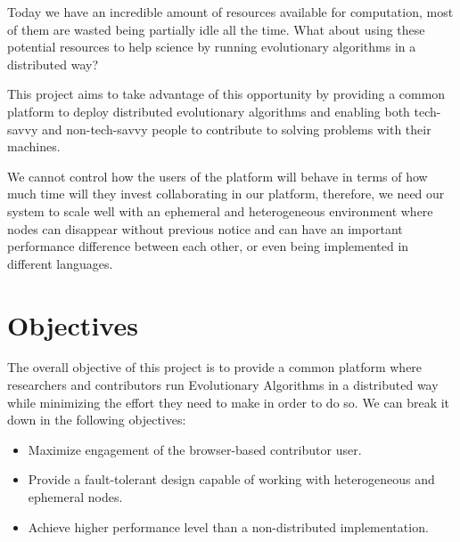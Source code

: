 Today we have an incredible amount of resources available for computation, most of them are wasted being partially idle all the time. What about using these potential resources to help science by running evolutionary algorithms in a distributed way?

This project aims to take advantage of this opportunity by providing a common platform to deploy distributed evolutionary algorithms and enabling both tech-savvy and non-tech-savvy people to contribute to solving problems with their machines.

We cannot control how the users of the platform will behave in terms of how much time will they invest collaborating in our platform, therefore, we need our system to scale well with an ephemeral and heterogeneous environment where nodes can disappear without previous notice and can have an important performance difference between each other, or even being implemented in different languages. 


\section{Objectives}
The overall objective of this project is to provide a common platform where researchers and contributors run Evolutionary Algorithms in a distributed way while minimizing the effort they need to make in order to do so. We can break it down in the following objectives:

\begin{itemize}
    \item Maximize engagement of the browser-based contributor user.
    
    \item Provide a fault-tolerant design capable of working with heterogeneous and ephemeral nodes.
    
    \item Achieve higher performance level than a non-distributed implementation.
\end{itemize}

